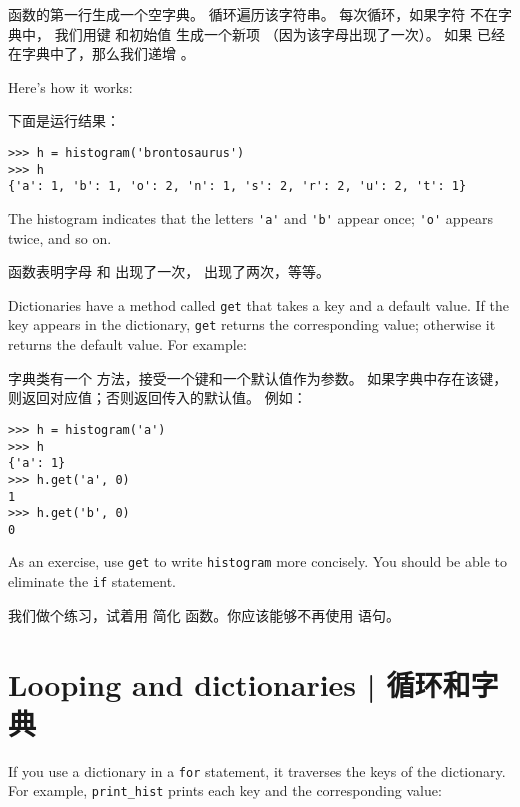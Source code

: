 函数的第一行生成一个空字典。  循环遍历该字符串。
每次循环，如果字符  不在字典中， 我们用键  和初始值  生成一个新项 （因为该字母出现了一次）。 如果  已经在字典中了，那么我们递增  。


Here's how it works:

下面是运行结果：

\begin{lstlisting}
>>> h = histogram('brontosaurus')
>>> h
{'a': 1, 'b': 1, 'o': 2, 'n': 1, 's': 2, 'r': 2, 'u': 2, 't': 1}
\end{lstlisting}

%
The histogram indicates that the letters \verb"'a'" and \verb"'b'"
appear once; \verb"'o'" appears twice, and so on.

 函数表明字母  和  出现了一次，   出现了两次，等等。

  

Dictionaries have a method called {\tt get} that takes a key
and a default value.  If the key appears in the dictionary,
{\tt get} returns the corresponding value; otherwise it returns
the default value.  For example:

字典类有一个  方法，接受一个键和一个默认值作为参数。
如果字典中存在该键，则返回对应值；否则返回传入的默认值。 例如：

\begin{lstlisting}
>>> h = histogram('a')
>>> h
{'a': 1}
>>> h.get('a', 0)
1
>>> h.get('b', 0)
0
\end{lstlisting}

%
As an exercise, use {\tt get} to write {\tt histogram} more concisely.  You
should be able to eliminate the {\tt if} statement.

我们做个练习，试着用  简化  函数。你应该能够不再使用  语句。


\section{Looping and dictionaries  |  循环和字典}

  

If you use a dictionary in a {\tt for} statement, it traverses
the keys of the dictionary.  For example, \verb"print_hist"
prints each key and the corresponding value:

